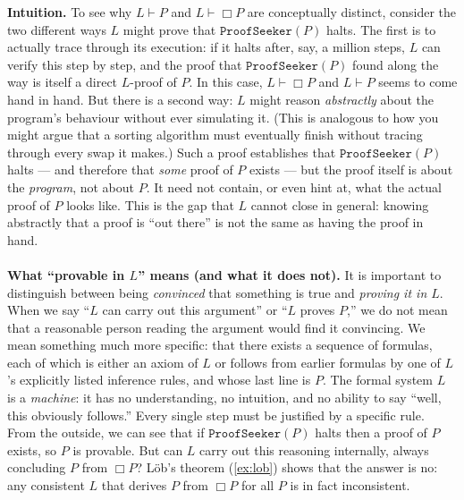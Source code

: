 \documentclass[11pt]{article}
\begin{document}
\medskip
\noindent
\textbf{Intuition.} To see why $L \vdash P$ and $L \vdash \Box P$ are conceptually
distinct, consider the two different ways $L$ might prove that
$\texttt{ProofSeeker}(P)$ halts. The first is to actually trace through its execution:
if it halts after, say, a million steps, $L$ can verify this step by step, and the proof
that $\texttt{ProofSeeker}(P)$ found along the way is itself a direct $L$-proof of $P$.
In this case, $L \vdash \Box P$ and $L \vdash P$ seems to come hand in hand. But there is a
second way: $L$ might reason \emph{abstractly} about the program's behaviour without
ever simulating it. (This is analogous to how you might argue that a sorting algorithm
must eventually finish without tracing through every swap it makes.) Such a proof
establishes that $\texttt{ProofSeeker}(P)$ halts --- and therefore that \emph{some}
proof of $P$ exists --- but the proof itself is about the \emph{program}, not about
$P$. It need not contain, or even hint at, what the actual proof of $P$ looks like.
This is the gap that $L$ cannot close in general: knowing abstractly that a proof is
``out there'' is not the same as having the proof in hand.\\\\



\medskip
\noindent
\textbf{What ``provable in $L$'' means (and what it does not).} It is
important to distinguish between being \emph{convinced} that something is true and
\emph{proving it in $L$}. When we say ``$L$ can carry out this argument'' or
``$L$ proves $P$,'' we do not mean that a reasonable person reading the argument
would find it convincing. We mean something much more specific: that there exists a
sequence of formulas, each of which is either an axiom of $L$ or follows from
earlier formulas by one of $L$'s explicitly listed inference rules, and whose last
line is $P$. The formal system $L$ is a \emph{machine}: it has no understanding, no
intuition, and no ability to say ``well, this obviously follows.'' Every single step
must be justified by a specific rule.\\

\noindent
From the outside, we can see that if $\texttt{ProofSeeker}(P)$ halts then a proof of $P$
exists, so $P$ is provable. But can $L$ carry out this reasoning internally, always concluding
$P$ from $\Box P$? L\"ob's theorem (\cref{ex:lob}) shows that the answer is no: any
consistent $L$ that derives $P$ from $\Box P$ for all $P$ is in fact inconsistent.
\end{document}
